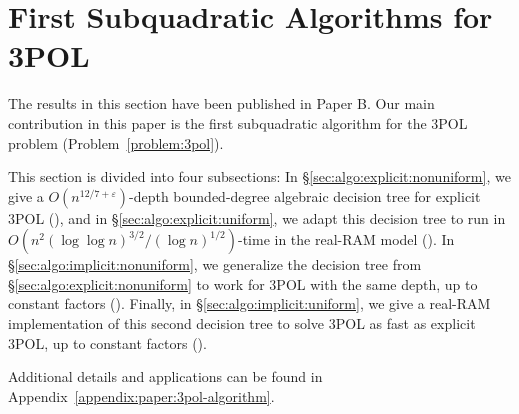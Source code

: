 \section{First Subquadratic Algorithms for 3POL}

The results in this section have been published in Paper B.
Our main contribution in this paper is the first subquadratic algorithm for
the 3POL problem (Problem~\ref{problem:3pol}).

This section is divided into four subsections:
%
In \S\ref{sec:algo:explicit:nonuniform},
we give a $O(n^{12/7+\varepsilon})$-depth bounded-degree
algebraic decision tree for explicit 3POL (), and in
\S\ref{sec:algo:explicit:uniform}, we adapt this decision tree
to run in $O(n^2 {(\log \log n)}^{3/2} / {(\log n)}^{1/2})$-time
in the real-RAM model ().
%
In \S\ref{sec:algo:implicit:nonuniform}, we generalize the decision tree from
\S\ref{sec:algo:explicit:nonuniform} to work for 3POL with the same depth, up
to constant factors ().
%
Finally, in \S\ref{sec:algo:implicit:uniform}, we give a real-RAM
implementation of this second decision tree to solve 3POL as fast as
explicit 3POL, up to constant factors ().

Additional details and applications can be found in Appendix~\ref{appendix:paper:3pol-algorithm}.





